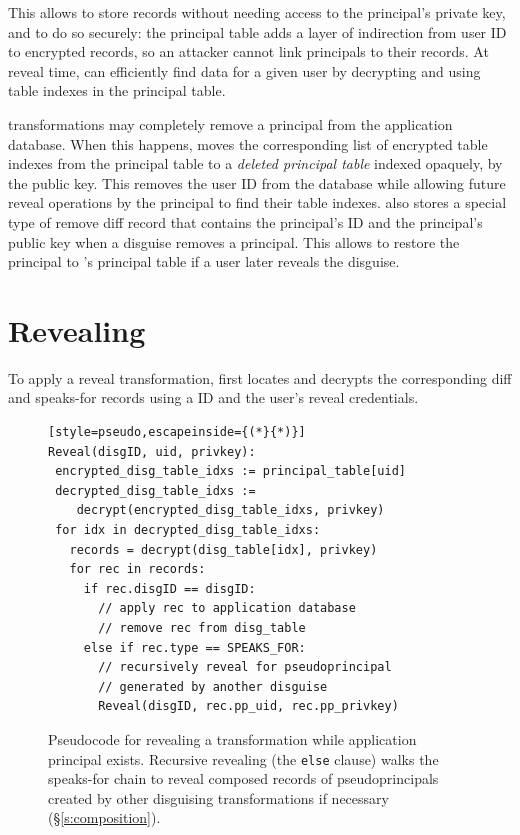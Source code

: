%
This allows \sys to store records without needing access to the principal's
private key, and to do so securely: the principal table adds a layer of
indirection from user ID to encrypted records, so an attacker cannot link
principals to their records.
%
At reveal time, \sys can efficiently find \xxed data for a given user
by decrypting and using \xx table indexes in the principal table.
%
%

%
\Xxing transformations may completely remove a principal from the
application database.
%
When this happens, \sys moves the corresponding list of encrypted \xx table
indexes from the principal table to a \emph{deleted principal table} indexed
opaquely, \eg by the public key.
%
This removes the user ID from the database while allowing future reveal
operations by the principal to find their \xx table indexes.
%
\sys also stores a special type of remove diff record that contains the
principal's ID and the principal's public key when a disguise removes a principal.  This
allows \sys to restore the principal to \sys's principal table if a user later
reveals the disguise.
%

\section{Revealing}
\label{s:reveal}

%
To apply a reveal transformation, \sys first locates and decrypts the
corresponding diff and speaks-for records using a \xx ID and the user’s reveal
credentials.
%

\begin{figure}[t]
  \small
\begin{lstlisting}[style=pseudo,escapeinside={(*}{*)}]
Reveal(disgID, uid, privkey):
 encrypted_disg_table_idxs := principal_table[uid]
 decrypted_disg_table_idxs :=
    decrypt(encrypted_disg_table_idxs, privkey)
 for idx in decrypted_disg_table_idxs:
   records = decrypt(disg_table[idx], privkey)
   for rec in records:
     if rec.disgID == disgID:
       // apply rec to application database
       // remove rec from disg_table
     else if rec.type == SPEAKS_FOR:
       // recursively reveal for pseudoprincipal
       // generated by another disguise
       Reveal(disgID, rec.pp_uid, rec.pp_privkey)
\end{lstlisting}
    \caption{Pseudocode for revealing a \xxing transformation while
    application principal  exists. Recursive revealing (the
    \texttt{\small else} clause) walks the speaks-for chain to reveal composed
    records of pseudoprincipals created by other disguising transformations
    if necessary (\S\ref{s:composition}).}
  \label{f:revealpseudo}
\end{figure}

